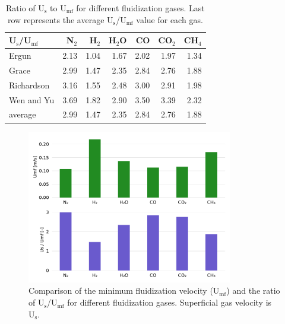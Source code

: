 \begin{table}[H]
    \centering
    \caption{Ratio of U$_\text{s}$ to U$_\text{mf}$ for different fluidization gases. Last row represents the average U$_\text{s}$/U$_\text{mf}$ value for each gas.}
    \label{tab:us-umf-ratio}
    \begin{tabular}{lrrrrrr}
        \toprule
        U$_\text{s}$/U$_\text{mf}$ & N$_2$ & H$_2$ & H$_2$O & CO & CO$_2$ & CH$_4$ \\
        \midrule
        Ergun                      & 2.13 & 1.04 & 1.67 & 2.02 & 1.97 & 1.34 \\
        Grace                      & 2.99 & 1.47 & 2.35 & 2.84 & 2.76 & 1.88 \\
        Richardson                 & 3.16 & 1.55 & 2.48 & 3.00 & 2.91 & 1.98 \\
        Wen and Yu                 & 3.69 & 1.82 & 2.90 & 3.50 & 3.39 & 2.32 \\
        average                    & 2.99 & 1.47 & 2.35 & 2.84 & 2.76 & 1.88 \\
        \bottomrule
    \end{tabular}
\end{table}

\begin{figure}[H]
    \centering
    \includegraphics[width=0.8\textwidth]{figures/umf-usumf-gases.pdf}
    \caption{Comparison of the minimum fluidization velocity (U$_\text{mf}$) and the ratio of U$_\text{s}$/U$_\text{mf}$ for different fluidization gases. Superficial gas velocity is U$_\text{s}$.}
    \label{fig:umf-usumf-gases}
\end{figure}

